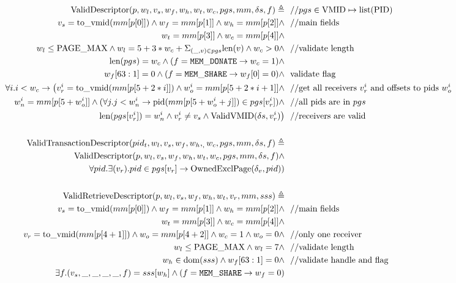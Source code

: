 \documentclass[a4paper]{article}
\newcommand*{\defined}{\triangleq}
\newcommand*{\PID}{\text{PID}}
\newcommand*{\VMID}{\text{VMID}}
\newcommand*{\PPMAX}{\text{PAGE\_MAX}}
\begin{document}
\begin{figure}[!htb]
    \begin{align*}
  \text{ValidDescriptor}(p,w_l,v_s,w_f,w_h,w_t,w_c,pgs,mm,\delta s,f)\defined &~~//pgs \in \VMID \mapsto \text{list}(\PID)\\
  v_{s}=\tv{mm[p[0]]} \land w_{f}=mm[p[1]] \land w_{h}=mm[p[2]] \land &~~//\text{main fields}\\
   w_{t} = mm[p[3]] \land w_{c} = mm[p[4]] \land &~~ \\
      w_l \le \PPMAX \land w_{l} = 5+3*w_{c} + \Sigma_{(\_,v)\in pgs} \text{len}(v) \land w_{c}>0 \land &~~//\text{validate length} \\
       \text{len}(pgs)=w_{c} \land (f={\tt{MEM\_DONATE}} \rightarrow w_{c}=1) \land&\\
      w_f[63:1] = 0 \land (f={\tt{MEM\_SHARE}} \rightarrow w_{f}[0]=0)\land&~~\text{validate flag}\\
  \forall i. i < w_{c}\rightarrow \big(v_{r}^{i}=\tv{mm[p[5+2*i]]} \land w_{o}^{i} = mm[p[5+2*i+1]] \land &~~//\text{get all receivers $v_{r}^{i}$ and offsets to pids $w_{o}^{i}$ }\\
  w_{n}^{i}=mm[p[5+w_{o}^{i}]] \land (\forall j. j < w_{n}^{i}\rightarrow \text{pid}(mm[p[5+w_{o}^{i}+j]])\in pgs[v_{r}^{i}]) \land&~~//\text{all pids are in $pgs$}\\
      \text{len}(pgs[v_{r}^{i}])=w_{n}^{i}\land v_{r}^{i}\ne v_{s} \land \text{ValidVMID}(\delta s,v_{r}^{i})\big) &~~//\text{receivers are valid}\\
      \\
  \text{ValidTransactionDescriptor}(pid_t,w_l,v_{s},w_f,w_{h},_,w_c,pgs,mm,\delta s,f) \defined & \\
  \text{ValidDescriptor}(p,w_l,v_s,w_f,w_h,w_t,w_c,pgs,mm,\delta s,f)  \land& \\
      \forall pid. \exists (v_{r}). pid \in pgs[v_{r}] \rightarrow \text{OwnedExclPage}(\delta_v, pid))\\
      \\
      \text{ValidRetrieveDescriptor}(p,w_l,v_s,w_f,w_h,w_t,v_{r},mm,sss)\defined &~~\\
  v_{s}=\tv{mm[p[0]]} \land w_{f}=mm[p[1]] \land w_{h}=mm[p[2]] \land &~~//\text{main fields}\\
      w_{t} = mm[p[3]] \land w_{c}=mm[p[4]] \land &\\
      v_{r} = \tv{mm[p[4+1]]}\land w_{o} = mm[p[4+2]]\land w_{c}= 1 \land w_{o}=0\land &~~\text{//only one receiver} \\
      w_l \le \PPMAX \land w_{l} = 7 \land  &~~//\text{validate length}\\
      w_h \in \text{dom}(sss)\land w_f[63:1]=0 \land  &~~//\text{validate handle and flag}\\
      \exists f. (v_s,\_, \_,\_, \_,f)=sss[w_h]\land (f={\tt{MEM\_SHARE}} \rightarrow w_{f}=0)
  \end{align*}
  \end{figure}
\end{document}
